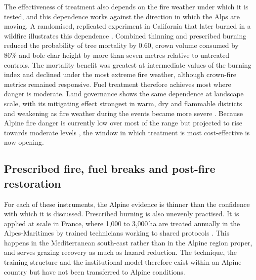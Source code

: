 \documentclass[11pt,a4paper]{article}
\begin{document}
The effectiveness of treatment also depends on the fire weather under which it is tested, and this dependence works against the direction in which the Alps are moving. A randomised, replicated experiment in California that later burned in a wildfire illustrates this dependence \citep{brodie_forest_2024}. Combined thinning and prescribed burning reduced the probability of tree mortality by 0.60, crown volume consumed by 86\% and bole char height by more than seven metres relative to untreated controls. The mortality benefit was greatest at intermediate values of the burning index and declined under the most extreme fire weather, although crown-fire metrics remained responsive. Fuel treatment therefore achieves most where danger is moderate. Land governance shows the same dependence at landscape scale, with its mitigating effect strongest in warm, dry and flammable districts and weakening as fire weather during the events became more severe \citep{spadoni_active_2023}. Because Alpine fire danger is currently low over most of the range but projected to rise towards moderate levels \citep{gerberding_mapping_2025, miller_climate_2024}, the window in which treatment is most cost-effective is now opening.

\subsection{Prescribed fire, fuel breaks and post-fire restoration}
\label{sec:fuelbreaks}

For each of these instruments, the Alpine evidence is thinner than the confidence with which it is discussed. Prescribed burning is also unevenly practised. It is applied at scale in France, where 1{,}000 to 3{,}000\,ha are treated annually in the Alpes-Maritimes by trained technicians working to shared protocols \citep{muller_forest_2020}. This happens in the Mediterranean south-east rather than in the Alpine region proper, and serves grazing recovery as much as hazard reduction. The technique, the training structure and the institutional model therefore exist within an Alpine country but have not been transferred to Alpine conditions.
\end{document}
